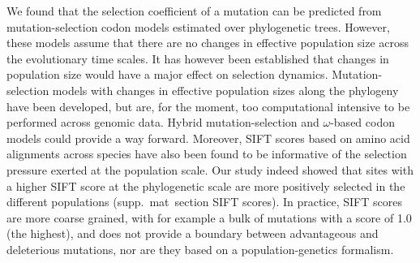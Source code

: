 \documentclass{article}
\begin{document}
    We found that the selection coefficient of a mutation can be predicted from mutation-selection codon models estimated over phylogenetic trees.
    However, these models assume that there are no changes in effective population size across the evolutionary time scales.
    It has however been established that changes in population size would have a major effect on selection dynamics\cite{lanfear_population_2014, jones_shifting_2017, platt_protein_2018}.
    Mutation-selection models with changes in effective population sizes along the phylogeny have been developed\cite{latrille_inferring_2021}, but are, for the moment, too computational intensive to be performed across genomic data.
    Hybrid mutation-selection and $\omega$-based codon models could provide a way forward\cite{brevet_reconstructing_2021}.
    Moreover, SIFT scores based on amino acid alignments across species have also been found to be informative of the selection pressure exerted at the population scale\cite{chen_hunting_2021}.
    Our study indeed showed that sites with a higher SIFT score at the phylogenetic scale are more positively selected in the different populations (supp.\ mat\  section SIFT scores).
    In practice, SIFT scores are more coarse grained, with for example a bulk of mutations with a score of 1.0 (the highest), and does not provide a boundary between advantageous and deleterious mutations, nor are they based on a population-genetics formalism.
\end{document}
